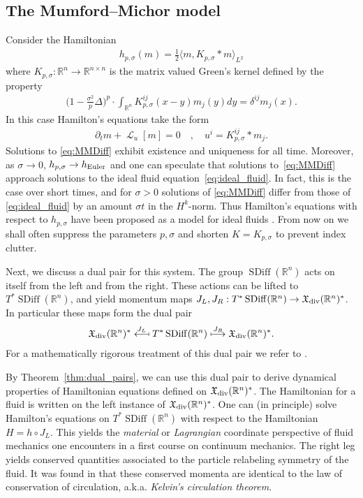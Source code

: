 \documentclass[12pt]{amsart}
\newcommand{\R}{\ensuremath{\mathbb{R}}}
\DeclareMathOperator{\SDiff}{SDiff}
\DeclareMathOperator{\lie}{\mathcal{L}}
\begin{document}
\subsection{The Mumford--Michor model}
\label{sec:MME}
Consider the Hamiltonian
\begin{align*}
  h_{p,\sigma}(m) = \frac{1}{2} \langle m , K_{p,\sigma} * m \rangle_{L^2}
\end{align*}
where $K_{p,\sigma}:\R^n \to \mathbb{R}^{n \times n}$ is the matrix
valued Green's kernel defined by the property
\begin{align*}
 \Big(1 - \frac{\sigma^2}{p} \Delta \Big)^p \cdot \int_{\R^n} K_{p,\sigma}^{ij}(x - y) m_j(y) dy = \delta^{ij} m_j(x).
\end{align*}
In this case Hamilton's equations take the form
\begin{align}
	\partial_t m+ \lie_u [ m] = 0 \quad , \quad u^i  = K^{ij}_{p,\sigma} * m_j. \label{eq:MMDiff}
\end{align}
Solutions to \eqref{eq:MMDiff} exhibit existence and uniqueness for all time.
Moreover, as $\sigma \to 0$, $h_{p,\sigma} \to h_{\rm Euler}$ and one
can speculate that solutions to~\eqref{eq:MMDiff}
approach solutions to the ideal fluid equation~\eqref{eq:ideal_fluid}.
In fact, this is the case over short times, and for $\sigma > 0$ solutions of \eqref{eq:MMDiff}
differ from those of \eqref{eq:ideal_fluid} by an amount $\sigma t$
in the $H^k$-norm.
Thus Hamilton's equations with respect to $h_{p,\sigma}$ have been proposed
as a model for ideal fluids \cite[Theorems 2 and 3]{MumfordMichor2013}. From now on we shall often suppress the
parameters $p,\sigma$ and shorten $K = K_{p,\sigma}$ to prevent index
clutter.

Next, we discuss a dual pair for this system.
The group $\SDiff(\R^n)$ acts on itself from the left and from the right.
These actions can be lifted to $T^* \SDiff(\R^n)$, and yield
momentum maps $J_L,J_R : T^*\SDiff(\R^n) \to \mathfrak{X}_{\rm div}(\R^n)^*$. In particular these maps form the dual pair
\begin{align*}
  \mathfrak{X}_{\rm div}(\R^n)^*
  \stackrel{J_L}{\longmapsfrom}
  T^* \SDiff(\R^n)
  \stackrel{J_R}{\longmapsto}
  \mathfrak{X}_{\rm div}(\R^n)^*.
\end{align*}
For a mathematically rigorous treatment of this dual pair we refer to \cite{GayBalmazVizman2012}.

By Theorem~\ref{thm:dual_pairs}, we can use this dual pair to derive dynamical properties of Hamiltonian equations defined on $\mathfrak{X}_{\rm div}(\R^n)^*$.
The Hamiltonian for a fluid is written on the left instance of $\mathfrak{X}_{\rm div}(\R^n)^*$.
One can (in principle) solve Hamilton's equations on $T^*\SDiff(\R^n)$
with respect to the Hamiltonian $H = h \circ J_L$.
This yields the \emph{material} or \emph{Lagrangian} coordinate perspective
of fluid mechanics one encounters in a first course on continuum
mechanics.
The right leg yields conserved quantities associated to the particle relabeling symmetry of the fluid.
It was found in \cite{Arnold1966} that these conserved momenta are identical
to the law of conservation of circulation, a.k.a. \emph{Kelvin's circulation theorem}.
\end{document}
